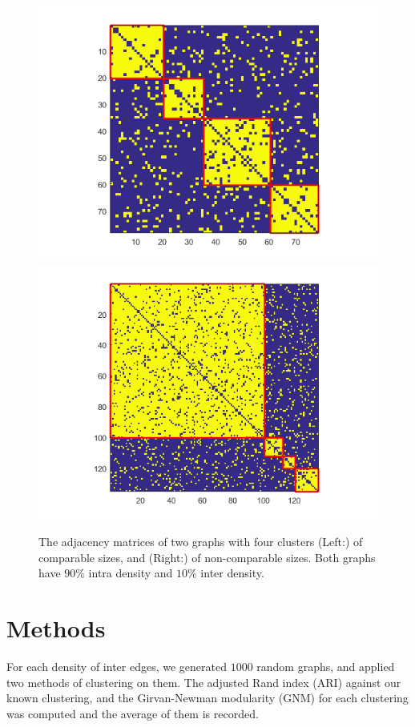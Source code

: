 \documentclass{amsart}
\begin{document}
		\begin{figure}[h]
		\begin{center}
			\includegraphics[scale=.4]{90intra10inter_20_15_25_18}
			\includegraphics[scale=.4]{90intra10inter_100_12_8_15}
			\caption{The adjacency matrices of two graphs with four clusters (Left:) of comparable sizes, and (Right:) of non-comparable sizes. Both graphs have $90\%$ intra density and $10\%$ inter density.}
			\label{two_sample_clustered_matrices}
		\end{center}
		\end{figure}
		
\newpage		
	\section{Methods}
		For each density of inter edges, we generated $1000$ random graphs, and applied two methods of clustering on them. The adjusted Rand index (ARI) against our known clustering, and the Girvan-Newman modularity (GNM) for each clustering was computed and the average of them is recorded.
			
\end{document}
